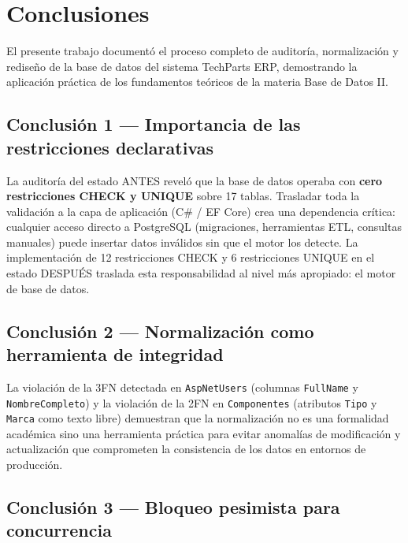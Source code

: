 
\section{Conclusiones}

El presente trabajo document\'o el proceso completo de auditor\'ia, normalización y redise\~no de la base de datos del sistema TechParts ERP, demostrando la aplicaci\'on pr\'actica de los fundamentos te\'oricos de la materia Base de Datos II.

\subsection{Conclusi\'on 1 --- Importancia de las restricciones declarativas}

La auditor\'ia del estado ANTES revel\'o que la base de datos operaba con \textbf{cero restricciones CHECK y UNIQUE} sobre 17 tablas.
Trasladar toda la validaci\'on a la capa de aplicaci\'on (C\# / EF Core) crea una dependencia cr\'itica: cualquier acceso directo a PostgreSQL (migraciones, herramientas ETL, consultas manuales) puede insertar datos inv\'alidos sin que el motor los detecte.
La implementaci\'on de 12 restricciones CHECK y 6 restricciones UNIQUE en el estado DESPU\'ES traslada esta responsabilidad al nivel m\'as apropiado: el motor de base de datos.

\subsection{Conclusi\'on 2 --- Normalizaci\'on como herramienta de integridad}

La violaci\'on de la 3FN detectada en \texttt{AspNetUsers} (columnas \texttt{FullName} y \texttt{NombreCompleto}) y la violaci\'on de la 2FN en \texttt{Componentes} (atributos \texttt{Tipo} y \texttt{Marca} como texto libre) demuestran que la normalizaci\'on no es una formalidad acad\'emica sino una herramienta pr\'actica para evitar anomal\'ias de modificaci\'on y actualización que comprometen la consistencia de los datos en entornos de producci\'on.

\subsection{Conclusi\'on 3 --- Bloqueo pesimista para concurrencia}

